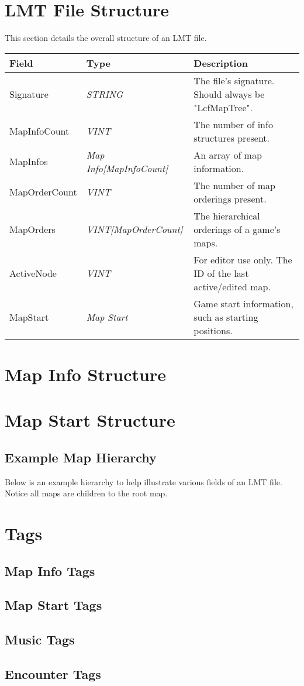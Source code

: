 \section{LMT File Structure}
This section details the overall structure of an LMT file.

\begin{table}[h!]
\centering
\begin{tabular}{|l|l|l|}
\hline
\textbf{Field} & \textbf{Type}                       & \textbf{Description}                                       \\ \hline
Signature      & \textit{STRING}                     & The file's signature. Should always be "LcfMapTree".       \\ \hline
MapInfoCount   & \textit{VINT}                       & The number of info structures present.                     \\ \hline
MapInfos       & \textit{Map Info{[}MapInfoCount{]}} & An array of map information.                               \\ \hline
MapOrderCount  & \textit{VINT}                       & The number of map orderings present.                       \\ \hline
MapOrders      & \textit{VINT{[}MapOrderCount{]}}    & The hierarchical orderings of a game's maps.               \\ \hline
ActiveNode     & \textit{VINT}                       & For editor use only. The ID of the last active/edited map. \\ \hline
MapStart       & \textit{Map Start}                  & Game start information, such as starting positions.        \\ \hline
\end{tabular}
\end{table}

\section{Map Info Structure}
\section{Map Start Structure}

\subsection{Example Map Hierarchy}
Below is an example hierarchy to help illustrate various fields of an LMT file. Notice all maps are children to the root map.

\section{Tags}
\subsection{Map Info Tags}
\subsection{Map Start Tags}
\subsection{Music Tags}
\subsection{Encounter Tags}


